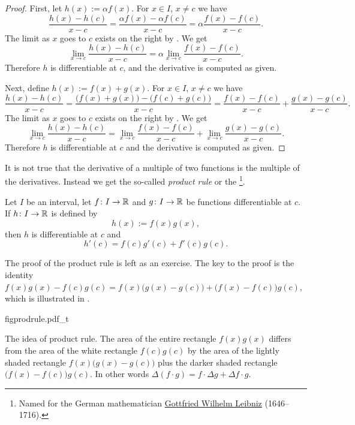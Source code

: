 \begin{proof}
First, let $h(x) := \alpha f(x)$.
For $x \in I$, $x \not= c$ we have
\begin{equation*}
\frac{h(x)-h(c)}{x-c} =
\frac{\alpha f(x) - \alpha f(c)}{x-c}
=
\alpha \frac{f(x) - f(c)}{x-c} .
\end{equation*}
The limit as $x$ goes to $c$ exists on the right
by .  We get
\begin{equation*}
\lim_{x\to c}\frac{h(x)-h(c)}{x-c} =
\alpha \lim_{x\to c} \frac{f(x) - f(c)}{x-c} .
\end{equation*}
Therefore $h$ is differentiable at $c$,
and the derivative is computed as given.

Next, define $h(x) := f(x)+g(x)$.
For $x \in I$, $x \not= c$ we have
\begin{equation*}
\frac{h(x)-h(c)}{x-c} =
\frac{\bigl(f(x) + g(x)\bigr) - \bigl(f(c) + g(c)\bigr)}{x-c}
=
\frac{f(x) - f(c)}{x-c}
+
\frac{g(x) - g(c)}{x-c} .
\end{equation*}
The limit as $x$ goes to $c$ exists on the right
by .  We get
\begin{equation*}
\lim_{x\to c}\frac{h(x)-h(c)}{x-c} =
\lim_{x\to c} \frac{f(x) - f(c)}{x-c}
+
\lim_{x\to c}\frac{g(x) - g(c)}{x-c} .
\end{equation*}
Therefore $h$ is differentiable at $c$
and the derivative is computed as given.
\end{proof}

It is not true that the derivative of a multiple of two functions is
the multiple of the derivatives.  Instead we get the so-called \emph{product
rule} or the \emph{}%
\footnote{Named for the German mathematician
\href{http://en.wikipedia.org/wiki/Leibniz}{Gottfried Wilhelm Leibniz}
(1646--1716).}.

\begin{prop}
Let $I$ be an interval, let
$f \colon I \to {\mathbb{R}}$ and $g \colon I \to {\mathbb{R}}$ be 
functions differentiable at $c$.  If $h \colon I \to {\mathbb{R}}$
is defined by
\begin{equation*}
h(x) := f(x) g(x) ,
\end{equation*}
then $h$ is differentiable at $c$ and
\begin{equation*}
h'(c) = f(c) g'(c) + f'(c) g(c) .
\end{equation*}
\end{prop}

The proof of the product rule is left as an exercise.  The key to the proof is 
the identity
$f(x) g(x) - f(c) g(c) =
f(x)\bigl( g(x) - g(c) \bigr)
+ \bigl( f(x) - f(c) \bigr) g(c)$,
which is illustrated in .
\begin{myfigureht}
{figprodrule.pdf_t}
\caption{The idea of product rule.  The area of the entire rectangle
$f(x)g(x)$ differs from the area of the white rectangle $f(c)g(c)$
by the area of the lightly shaded rectangle
$f(x)\bigl( g(x) - g(c) \bigr)$ plus the darker shaded rectangle
$\bigl( f(x) - f(c) \bigr) g(c)$.
In other words $\Delta (f \cdot g)
= f \cdot \Delta g + \Delta f \cdot g$.\label{figprodrule}}
\end{myfigureht}



